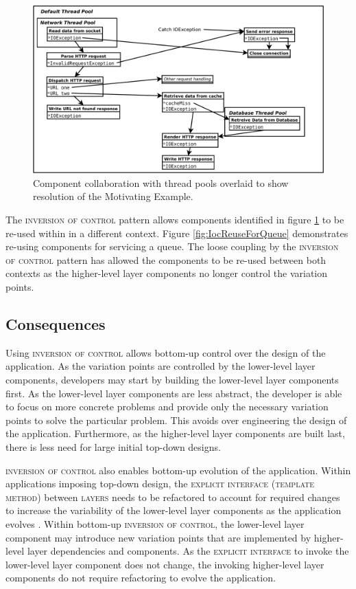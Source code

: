 \documentclass[prodmode]{style/acmlarge}
\begin{document}
\begin{figure}[t]
\centering
\includegraphics[width=4.5in]{IocMotivatingExampleResolved}
\caption{Component collaboration with thread pools overlaid to show resolution of the Motivating Example.}
\label{fig:IocMotivatingExampleResolved}
\end{figure}

The \textsc{inversion of control} pattern allows components identified in figure
\ref{fig:IocMotivatingExampleResolved} to be re-used within in a different
context. Figure \ref{fig:IocReuseForQueue} demonstrates re-using components for
servicing a queue.  The loose coupling by the \textsc{inversion of control}
pattern has allowed the components to be re-used between both contexts as the
higher-level layer components no longer control the variation points.


\subsection{Consequences}

Using \textsc{inversion of control} allows bottom-up control over the design of
the application.  As the variation points are controlled by the lower-level
layer components, developers may start by building the lower-level layer
components first.  As the lower-level layer components are less abstract, the
developer is able to focus on more concrete problems and provide only the
necessary variation points to solve the particular problem.  This avoids over
engineering the design of the application.  Furthermore, as the higher-level
layer components are built last, there is less need for large initial top-down
designs.

\textsc{inversion of control} also enables bottom-up evolution of the
application.  Within applications imposing top-down design, the
\textsc{explicit interface} (\textsc{template method}) between \textsc{layers}
needs to be refactored to account for required changes to increase the
variability of the lower-level layer components as the application evolves
\cite{ioc}.  Within bottom-up \textsc{inversion of control}, the lower-level
layer component may introduce new variation points that are implemented by
higher-level layer dependencies and components.  As the \textsc{explicit
interface} to invoke the lower-level layer component does not change, the
invoking higher-level layer components do not require refactoring to evolve the
application.
\end{document}
